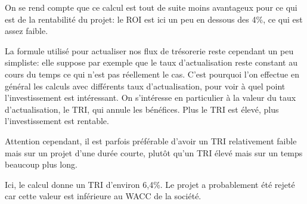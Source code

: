On se rend compte que ce calcul est tout de suite moins 
avantageux pour ce qui est de la rentabilité du projet: 
le ROI est ici un peu en dessous des 4\%, ce qui est 
assez faible.

La formule utilisé pour actualiser nos flux de trésorerie 
reste cependant un peu simpliste: elle suppose par exemple 
que le taux d'actualisation reste constant au cours du temps 
ce qui n'est pas réellement le cas. 
C'est pourquoi l'on effectue en général les calculs avec 
différents taux d'actualisation, pour voir à quel point 
l'investissement est intéressant. 
On s'intéresse en 
particulier à la valeur du taux d'actualisation, le TRI, qui 
annule les bénéfices. Plus le TRI est élevé, plus 
l'investissement est rentable.

Attention cependant, il est parfois préférable d'avoir 
un TRI relativement faible mais sur un projet d'une durée 
courte, plutôt qu'un TRI élevé mais sur un temps beaucoup 
plus long.

Ici, le calcul donne un TRI d'environ 6,4\%. 
Le projet a probablement été rejeté car cette valeur est 
inférieure au WACC de la société.


